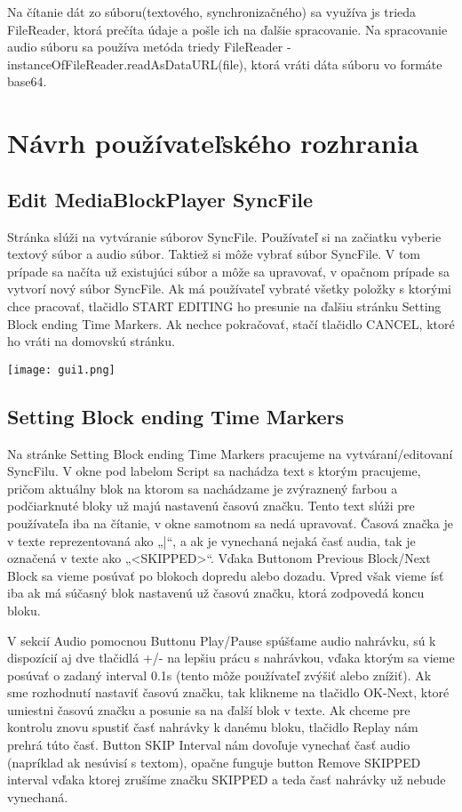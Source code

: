\documentclass{article}
\begin{document}
Na čítanie dát zo súboru(textového, synchronizačného) sa využíva js trieda FileReader, ktorá prečíta údaje a pošle ich na ďalšie spracovanie. 
Na spracovanie audio súboru sa používa metóda triedy FileReader - instanceOfFileReader.readAsDataURL(file), ktorá vráti dáta súboru vo formáte base64.
\section{Návrh používateľského rozhrania }

\subsection{Edit MediaBlockPlayer SyncFile}
Stránka slúži na vytváranie súborov SyncFile. Používateľ si na začiatku vyberie textový súbor a audio súbor. Taktiež si môže vybrať súbor SyncFile. V tom prípade sa načíta už existujúci súbor a môže sa upravovať, v opačnom prípade sa vytvorí nový súbor SyncFile. Ak má používateľ vybraté všetky položky s ktorými chce pracovať, tlačidlo START EDITING ho presunie na ďalšiu stránku Setting Block ending Time Markers. Ak nechce pokračovať, stačí tlačidlo CANCEL, ktoré ho vráti na domovskú stránku.

\texttt{[image: gui1.png]}

\subsection{Setting Block ending Time Markers}
Na stránke Setting Block ending Time Markers pracujeme na vytváraní/editovaní SyncFilu. V okne pod labelom Script sa nachádza text s ktorým pracujeme, pričom aktuálny blok na ktorom sa nachádzame je zvýraznený farbou a podčiarknuté bloky už majú nastavenú časovú značku. Tento text slúži pre používateľa iba na čítanie, v okne samotnom sa nedá upravovať. Časová značka je v texte reprezentovaná ako „|“, a ak je vynechaná nejaká časť audia, tak je označená v texte ako „<SKIPPED>“. Vďaka Buttonom Previous Block/Next Block sa vieme posúvať po blokoch dopredu alebo dozadu. Vpred však vieme ísť iba ak má súčasný blok nastavenú už časovú značku, ktorá zodpovedá koncu bloku.

V sekcií Audio pomocnou Buttonu Play/Pause spúšťame audio nahrávku, sú k dispozícií aj dve tlačidlá +/- na lepšiu prácu s nahrávkou, vďaka ktorým sa vieme posúvať o zadaný interval 0.1s (tento môže používateľ zvýšiť alebo znížiť). Ak sme rozhodnutí nastaviť časovú značku, tak klikneme na tlačidlo OK-Next, ktoré umiestni časovú značku a posunie sa na ďalší blok v texte. Ak chceme pre kontrolu znovu spustiť časť nahrávky k danému bloku, tlačidlo Replay nám prehrá túto časť. Button SKIP Interval nám dovoľuje vynechať časť audio (napríklad ak nesúvisí s textom), opačne funguje button Remove SKIPPED interval vďaka ktorej zrušíme značku SKIPPED a teda časť nahrávky už nebude vynechaná. 
\end{document}
